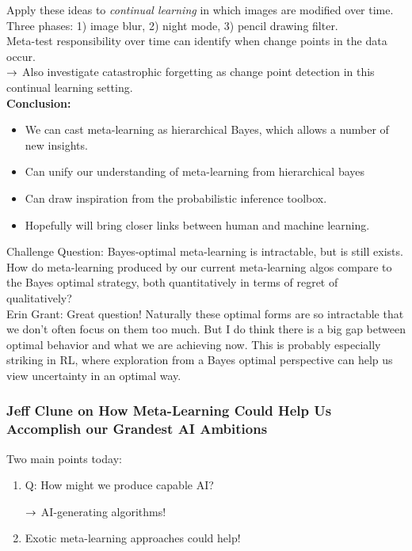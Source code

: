 Apply these ideas to {\it continual learning} in which images are modified over time. Three phases: 1) image blur, 2) night mode, 3) pencil drawing filter. \\

Meta-test responsibility over time can identify when change points in the data occur. \\

$\rightarrow$ Also investigate catastrophic forgetting as change point detection in this continual learning setting. \\

{\bf Conclusion:}
\begin{itemize}
    \item We can cast meta-learning as hierarchical Bayes, which allows a number of new insights.
    \item Can unify our understanding of meta-learning from hierarchical bayes
    \item Can draw inspiration from the probabilistic inference toolbox.
    \item Hopefully will bring closer links between human and machine learning.
\end{itemize}

Challenge Question: Bayes-optimal meta-learning is intractable, but is still exists. How do meta-learning produced by our current meta-learning algos compare to the Bayes optimal strategy, both quantitatively in terms of regret of qualitatively?\\

Erin Grant: Great question! Naturally these optimal forms are so intractable that we don't often focus on them too much. But I do think there is a big gap between optimal behavior and what we are achieving now. This is probably especially striking in RL, where exploration from a Bayes optimal perspective can help us view uncertainty in an optimal way. \\

\subsubsection{Jeff Clune on How Meta-Learning Could Help Us Accomplish our Grandest AI Ambitions}

Two main points today:
\begin{enumerate}
    \item Q: How might we produce capable AI?
    
    $\rightarrow$ AI-generating algorithms!
    
    \item Exotic meta-learning approaches could help!
\end{enumerate}

